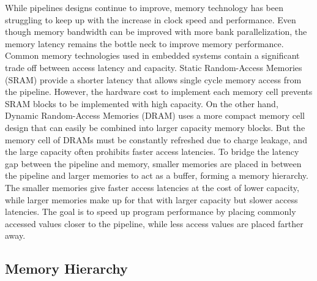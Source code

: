 While pipelines designs continue to improve, memory technology has been struggling to keep up with the increase in clock speed and performance.
Even though memory bandwidth can be improved with more bank parallelization, the memory latency remains the bottle neck to improve memory performance.
Common memory technologies used in embedded systems contain a significant trade off between access latency and capacity. 
Static Random-Access Memories (SRAM) provide a shorter latency that allows single cycle memory access from the pipeline.
However, the hardware cost to implement each memory cell prevents SRAM blocks to be implemented with high capacity.
On the other hand, Dynamic Random-Access Memories (DRAM) uses a more compact memory cell design that can easily be combined into larger capacity memory blocks.
But the memory cell of DRAMs must be constantly refreshed due to charge leakage, and the large capacity often prohibits faster access latencies.
To bridge the latency gap between the pipeline and memory, smaller memories are placed in between the pipeline and larger memories to act as a buffer, forming a memory hierarchy.
The smaller memories give faster access latencies at the cost of lower capacity, while larger memories make up for that with larger capacity but slower access latencies. 
The goal is to speed up program performance by placing commonly accessed values closer to the pipeline, while less access values are placed farther away.

\subsection{Memory Hierarchy}
